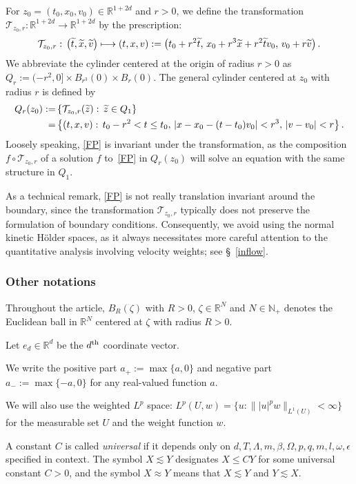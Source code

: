 \documentclass[10pt]{amsart}
\theoremstyle{definition}\newtheorem{defi}[theo]{Definition}\newtheorem{rema}[theo]{Remark}\newtheorem{exam}[theo]{Example}\newtheorem{exem}[theo]{Example}\newtheorem{nota}[theo]{Notation}
\newcommand*\N {\mathbb{N}}
\newcommand*\R {\mathbb{R}}
\newcommand*\T{\mathcal{T}}
\let\oldtilde\tilde
\renewcommand*{\tilde}[1]{\mathchoice{\widetilde{#1}}{\widetilde{#1}}{\oldtilde{#1}}{\oldtilde{#1}}}
\begin{document}
For $z_0=(t_0,x_0,v_0)\in\R^{1+2d}$ and $r>0$, we define the transformation $\T_{z_0,r}:\R^{1+2d}\rightarrow\R^{1+2d}$ by the prescription:
\begin{align*}
\T_{z_0,r}:\, \left(\tilde{t},\tilde{x},\tilde{v}\right) \longmapsto (t,x,v):=\left(t_0+r^2\tilde{t},\,x_0+r^3\tilde{x}+r^2\tilde{t}v_0,\,v_0+r\tilde{v}\right).
\end{align*}
We abbreviate the cylinder centered at the origin of radius $r>0$ as $Q_r:= (-r^2, 0] \times B_{r^3}(0) \times B_r(0)$. The general cylinder centered at $z_0$ with radius $r$ is defined by
\begin{align*}
Q_r(z_{0}):=&\left\{ \T_{z_0,r}(\tilde{z}): \, \tilde{z}\in Q_1\right\}\\
=&\left\{ (t,x,v): \, t_{0} - r^{2} < t \le t_{0}, \, |x - x_{0} - (t - t_{0})v_{0}| < r^{3},\, |v - v_{0}| < r\right\}.
\end{align*}
Loosely speaking, \eqref{FP} is invariant under the transformation, as the composition $f\circ\T_{z_0,r}$ of a solution $f$ to~\eqref{FP} in $Q_r(z_{0})$ will solve an equation with the same structure in $Q_1$.

As a technical remark, \eqref{FP} is not really translation invariant around the boundary, since the transformation $\T_{z_0,r}$ typically does not preserve the formulation of boundary conditions. Consequently, we avoid using the normal kinetic H\"older spaces, as it always necessitates more careful attention to the quantitative analysis involving velocity weights; see \S~\ref{inflow}.

\subsubsection{Other notations}\label{notations}


Throughout the article, $B_R(\zeta)$ with $R>0$, $\zeta\in\R^N$ and $N\in\N_+$ denotes the Euclidean ball in $\R^N$ centered at $\zeta$ with radius $R>0$.

Let $e_d\in\R^d$ be the $d^{\rm th}$ coordinate vector.

We write the positive part $a_+:=\max\{a,0\}$ and negative part $a_-:=\max\{-a,0\}$ for any real-valued function $a$.

We will also use the weighted $L^p$ space: $L^p(U,w)=\{u:\||u|^pw\|_{L^1(U)}<\infty\}$ for the measurable set $U$ and the weight function $w$.

A constant $C$ is called \emph{universal} if it depends only on $d,T,\Lambda,m,\beta,\Omega,p,q,m,l,\omega,\epsilon$ specified in context. The symbol $X\lesssim Y$ designates $X\le CY$ for some universal constant $C>0$, and the symbol $X\approx Y$ means that $X\lesssim Y$ and $Y\lesssim X$.
\end{document}
